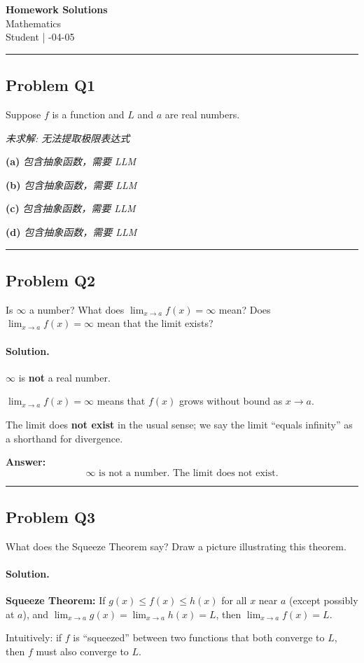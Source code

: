 \documentclass[12pt, a4paper]{article}
\newcommand{\problem}[1]{\subsection*{Problem #1}}
\newcommand{\solution}{\paragraph{Solution.}}
\begin{document}
\begin{center}
    {\LARGE\bfseries Homework Solutions} \\[0.5em]
    {\large Mathematics} \\[0.3em]
    Student \quad | -04-05
\end{center}

\hrule
\vspace{1em}
\problem{Q1}

Suppose $f$ is a function and $L$ and $a$ are real numbers.

\textit{\color{red} 未求解: 无法提取极限表达式}

\textbf{(a)}
\textit{\color{red} 包含抽象函数，需要 LLM}

\textbf{(b)}
\textit{\color{red} 包含抽象函数，需要 LLM}

\textbf{(c)}
\textit{\color{red} 包含抽象函数，需要 LLM}

\textbf{(d)}
\textit{\color{red} 包含抽象函数，需要 LLM}

\vspace{1em}
\hrule
\vspace{1em}

\problem{Q2}

Is $\infty$ a number? What does $\lim_{x \to a} f(x) = \infty$ mean? Does $\lim_{x \to a} f(x) = \infty$ mean that the limit exists?

\solution

$\infty$ is \textbf{not} a real number.

$\lim_{x \to a} f(x) = \infty$ means that $f(x)$ grows without bound as $x \to a$.

The limit does \textbf{not exist} in the usual sense; we say the limit ``equals infinity'' as a shorthand for divergence.

\textbf{Answer:}
\[\boxed{\infty \text{ is not a number. The limit does not exist.}}\]

\vspace{1em}
\hrule
\vspace{1em}

\problem{Q3}

What does the Squeeze Theorem say? Draw a picture illustrating this theorem.

\solution

\textbf{Squeeze Theorem:} If $g(x) \le f(x) \le h(x)$ for all $x$ near $a$ (except possibly at $a$), and $\lim_{x \to a} g(x) = \lim_{x \to a} h(x) = L$, then $\lim_{x \to a} f(x) = L$.

Intuitively: if $f$ is ``squeezed'' between two functions that both converge to $L$, then $f$ must also converge to $L$.
\end{document}
